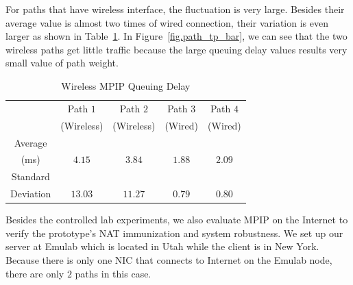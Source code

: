 For paths that have wireless interface, the fluctuation is very large. Besides their average value is almost two times of wired connection, their variation is even larger as shown in Table~\ref{tb.wireless}. In Figure~\ref{fig.path_tp_bar}, we can see that the two wireless paths get little traffic because the large queuing delay values results very small value of path weight.


\begin{table}
\caption{\label{tb.wireless}Wireless MPIP Queuing Delay}
\centering
\begin{tabular}{|c|c|c|c|c|}
\hline
  & Path $1$   &  Path $2$   &  Path $3$ &  Path $4$\\
  & (Wireless) &  (Wireless) &  (Wired)  &  (Wired) \\
\hline
Average &   &   &   & \\
(ms) & $4.15$ & $3.84$ & $1.88$ & $2.09$ \\
\hline
Standard &   &   &   & \\
Deviation  & $13.03$ & $11.27$ & $0.79$ & $0.80$ \\
\hline
\end{tabular}
\end{table}

%

Besides the controlled lab experiments, we also evaluate MPIP on the Internet to verify the prototype's NAT immunization and system robustness. We set up our server at Emulab\cite{emulab} which is located in Utah while the client is in New York. Because there is only one NIC that connects to Internet on the Emulab node, there are only $2$ paths in this case. 


